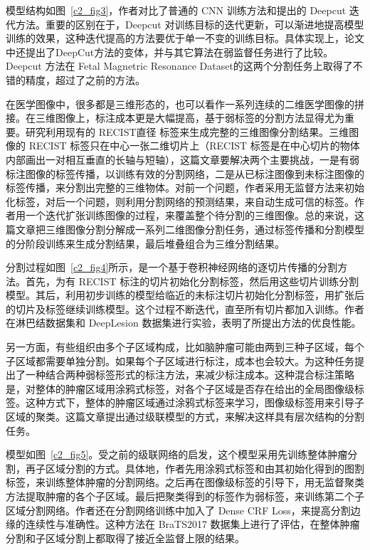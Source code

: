 模型结构如图~\ref{c2_fig3}，作者对比了普通的 CNN 训练方法和提出的 Deepcut 迭代方法。重要的区别在于，Deepcut 对训练目标的迭代更新，可以渐进地提高模型训练的效果，这种迭代提高的方法要优于单一不变的训练目标。具体实现上，论文中还提出了DeepCut方法的变体，并与其它算法在弱监督任务进行了比较。Deepcut 方法在 Fetal Magnetric Resonance Dataset\citep{damodaram2012foetal}的这两个分割任务上取得了不错的精度，超过了之前的方法。

在医学图像中，很多都是三维形态的，也可以看作一系列连续的二维医学图像的拼接。在三维图像上，标注成本更是大幅提高，基于弱标签的分割方法显得尤为重要。\citet{cai2018accurate}研究利用现有的 RECIST直径 标签来生成完整的三维图像分割结果。三维图像的 RECIST 标签只在中心一张二维切片上（RECIST 标签是在中心切片的物体内部画出一对相互垂直的长轴与短轴），这篇文章要解决两个主要挑战，一是有弱标注图像的标签传播，以训练有效的分割网络，二是从已标注图像到未标注图像的标签传播，来分割出完整的三维物体。对前一个问题，作者采用无监督方法来初始化标签，对后一个问题，则利用分割网络的预测结果，来自动生成可信的标签。作者用一个迭代扩张训练图像的过程，来覆盖整个待分割的三维图像。总的来说，这篇文章把三维图像分割分解成一系列二维图像分割任务，通过标签传播和分割模型的分阶段训练来生成分割结果，最后堆叠组合为三维分割结果。

分割过程如图~\ref{c2_fig4}所示，是一个基于卷积神经网络的逐切片传播的分割方法。首先，为有 RECIST 标注的切片初始化分割标签，然后用这些切片训练分割模型。其后，利用初步训练的模型给临近的未标注切片初始化分割标签，用扩张后的切片及标签继续训练模型。这个过程不断迭代，直至所有切片都加入训练。作者在淋巴结数据集和\citep{roth2014new} DeepLesion 数据集\citep{yan2018deep}进行实验，表明了所提出方法的优良性能。

另一方面，有些组织由多个子区域构成，比如脑肿瘤可能由两到三种子区域，每个子区域都需要单独分割。如果每个子区域进行标注，成本也会较大。\citet{ji2019scribble}为这种任务提出了一种结合两种弱标签形式的标注方法，来减少标注成本。这种混合标注策略是，对整体的肿瘤区域用涂鸦式标签，对各个子区域是否存在给出的全局图像级标签。这种方式下，整体的肿瘤区域通过涂鸦式标签来学习，图像级标签用来引导子区域的聚类。这篇文章提出通过级联模型的方式，来解决这样具有层次结构的分割任务。

模型如图~\ref{c2_fig5}。受之前的级联网络的启发，这个模型采用先训练整体肿瘤分割，再子区域分割的方式。具体地，作者先用涂鸦式标签和由其初始化得到的图割标签，来训练整体肿瘤的分割网络。之后再在图像级标签的引导下，用无监督聚类方法提取肿瘤的各个子区域。最后把聚类得到的标签作为弱标签，来训练第二个子区域分割网络。作者还在分割网络训练中加入了 Dense CRF Loss，来提高分割边缘的连续性与准确性。这种方法在 BraTS2017 数据集上进行了评估，在整体肿瘤分割和子区域分割上都取得了接近全监督上限的结果。

